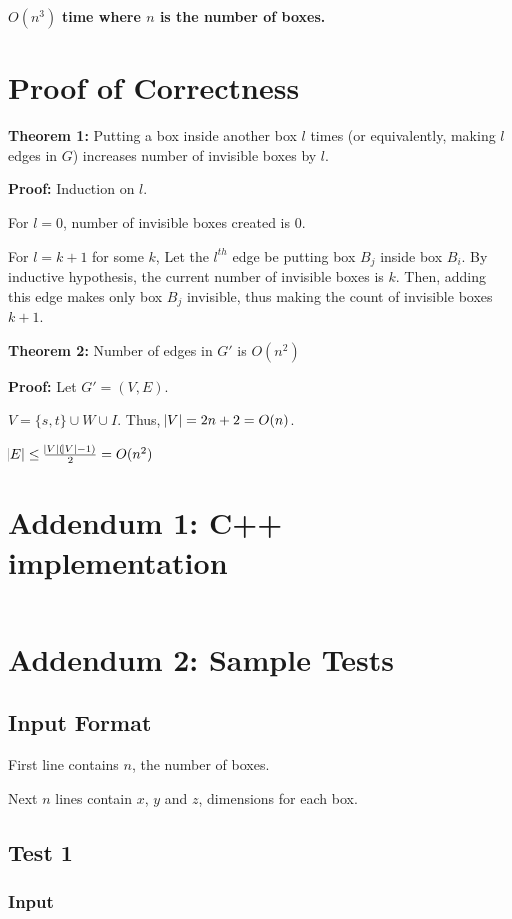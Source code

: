 \documentclass{article}
\begin{document}
$O(n^3)$ \textbf{time where $n$ is the number of boxes.}


\section{Proof of Correctness}

\textbf{Theorem 1:} Putting a box inside another box $l$ times (or equivalently, making $l$ edges in $G$) increases number of invisible boxes by $l$.  

\textbf{Proof:} Induction on $l$. 

For $l = 0$, number of invisible boxes created is 0. 

For $l = k + 1$ for some $k$, Let the $l^{th}$ edge be putting box $B_j$ inside box $B_i$. By inductive hypothesis, the current number of invisible boxes is $k$. Then, adding this edge makes only box $B_j$ invisible, thus making the count of invisible boxes $k+1$. 

\textbf{Theorem 2:} Number of edges in $G'$ is $O(n^2)$

\textbf{Proof:}
Let $G' = (V, E)$. 

$V = \{s,t\} \cup W \cup I$. Thus, $\abs{V} = 2n + 2 = O(n)$. 

$\abs{E} \leq \frac{\abs{V}(\abs{V} - 1)}{2} = O(n^2)$


\section*{Addendum 1: C++ implementation}

\inputminted[linenos, breaklines]{cpp}{minvisible.cpp}

\section*{Addendum 2: Sample Tests}

\subsection{Input Format}

First line contains $n$, the number of boxes.

Next $n$ lines contain $x$, $y$ and $z$, dimensions for each box.

\subsection{Test 1}
\subsubsection*{Input}
\inputminted{sh}{./tests/in1}
\end{document}
